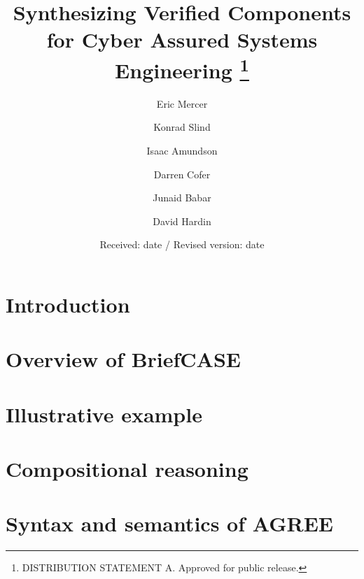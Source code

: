 \documentclass[global,twocolumn,keeplastbox]{svjour}
\begin{document}
\title{
  Synthesizing Verified Components for Cyber Assured Systems Engineering
  \thanks{DISTRIBUTION STATEMENT A.  Approved for public release.}
}

\author{
  Eric Mercer    \and
  Konrad Slind   \and
  Isaac Amundson \and
  Darren Cofer   \and
  Junaid Babar   \and
  David Hardin
}


\date{Received: date / Revised version: date}

\maketitle

\begin{abstract}

\end{abstract}

\section{Introduction} \label{sec:intro}


\section{Overview of BriefCASE}
\label{sec:overview}


\section{Illustrative example}
\label{sec:example}


\section{Compositional reasoning}
\label{sec:agree}


\section{Syntax and semantics of AGREE}
\label{sec:agree-semantics}

\end{document}

